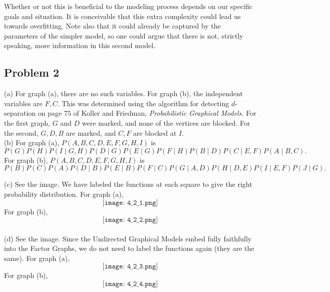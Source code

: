 \documentclass[12pt]{article}
\theoremstyle{remark}
\begin{document}
Whether or not this is beneficial to the modeling process depends on our specific goals and situation. It is conceivable that this extra complexity could lead us towards overfitting. Note also that it could already be captured by the parameters of the simpler model, so one could argue that there is not, strictly speaking, more information in this second model. 

\subsection*{Problem 2} (a) For graph (a), there are no such variables. For graph (b), the independent variables are $F,C$. This was determined using the algorithm for detecting $d$-separation on page $75$ of Koller and Friedman, \textit{Probabilistic Graphical Models.} For the first graph, $G$ and $D$ were marked, and none of the vertices are blocked. For the second, $G,D,B$ are marked, and $C,F$ are blocked at $I$. \\

\noindent (b) For graph (a), $P(A,B,C,D,E,F,G,H,I)$ is 
\[
P(G) P(H) P(I \mid G,H) P(D \mid G) P(E \mid G) P(F \mid H) P(B \mid D) P(C \mid E,F) P(A \mid B,C).
\]
For graph (b), $P(A,B,C,D,E,F,G,H,I)$ is
\[
P(B) P(C) P(A) P(D \mid B) P(E \mid B) P(F \mid C) P(G \mid A,D) P(H \mid D,E) P(I \mid E,F) P(J \mid G).
\]

\noindent (c) See the image. We have labeled the functions at each square to give the right probability distribution. For graph (a),
\[
\texttt{[image: 4\_2\_1.png]}
\]
For graph (b),
\[
\texttt{[image: 4\_2\_2.png]}
\]
\\

\noindent (d) See the image. Since the Undirected Graphical Models embed fully faithfully into the Factor Graphs, we do not need to label the functions again (they are the same). For graph (a),
\[
\texttt{[image: 4\_2\_3.png]}
\]
For graph (b),
\[
\texttt{[image: 4\_2\_4.png]}
\]
\end{document}
